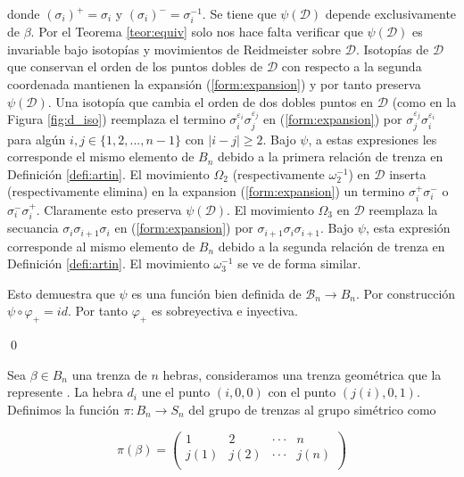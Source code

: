 \documentclass[12pt]{article}
\theoremstyle{definition}
\begin{document}
donde $(\sigma_i)^+=\sigma_i$ y $(\sigma_i)^-=\sigma_i^{-1}$. Se tiene que $\psi(\mathcal{D})$ depende exclusivamente de $\beta$. Por el Teorema \ref{teor:equiv} solo nos hace falta verificar que $\psi(\mathcal{D})$ es invariable bajo isotopías y movimientos de Reidmeister sobre $\mathcal{D}$. Isotopías de $\mathcal{D}$ que conservan el orden de los puntos dobles de $\mathcal{D}$ con respecto a la segunda coordenada mantienen la expansión (\ref{form:expansion}) y por tanto preserva $\psi(\mathcal{D})$. Una isotopía que cambia el orden de dos dobles puntos en $\mathcal{D}$ (como en la Figura \ref{fig:d_iso}) reemplaza el termino $\sigma_i^{\varepsilon_i}\sigma_j^{\varepsilon_j}$ en (\ref{form:expansion}) por $\sigma_j^{\varepsilon_j}\sigma_i^{\varepsilon_i}$ para algún $i,j\in\{1,2,...,n-1\}$ con $|i-j|\geq 2$. Bajo $\psi$, a estas expresiones les corresponde el mismo elemento de $B_n$ debido a la primera relación de trenza en Definición
 \ref{defi:artin}.
\newline
\newline
El movimiento $\Omega_2$ (respectivamente $\omega_2^{-1}$) en $\mathcal{D}$ inserta (respectivamente elimina) en la expansion (\ref{form:expansion}) un termino $\sigma_i^+\sigma_i^-$ o $\sigma_i^-\sigma_i^+$. Claramente esto preserva $\psi(\mathcal{D})$.
\newline
\newline
El movimiento $\Omega_3$ en $\mathcal{D}$ reemplaza la secuancia $\sigma_{i}\sigma_{i+1}\sigma_{i}$ en (\ref{form:expansion}) por $\sigma_{i+1}\sigma_{i}\sigma_{i+1}$. Bajo $\psi$, esta expresión corresponde al mismo elemento de $B_n$ debido a la segunda relación de trenza en Definición \ref{defi:artin}. El movimiento $\omega_3^{-1}$ se ve de forma similar.
\newline
\newline

Esto demuestra que $\psi$ es una función bien definida de $\mathcal{B}_n\rightarrow B_n$. Por construcción $\psi\circ\varphi_+=id$. Por tanto $\varphi_+$ es sobreyectiva e inyectiva.




\qed




Sea $\beta\in B_n$ una trenza de $n$ hebras, consideramos una trenza geométrica que la represente . La hebra $d_i$ une el punto $(i,0,0)$ con el punto $(j(i),0,1).$ Definimos la función $\pi:B_n\rightarrow S_n$ del grupo de trenzas al grupo simétrico como

$$\pi(\beta) = \begin{pmatrix}
1 & 2 & \cdot\cdot\cdot & n\\
j(1) & j(2) & \cdot\cdot\cdot & j(n)\\
\end{pmatrix} $$
\end{document}
